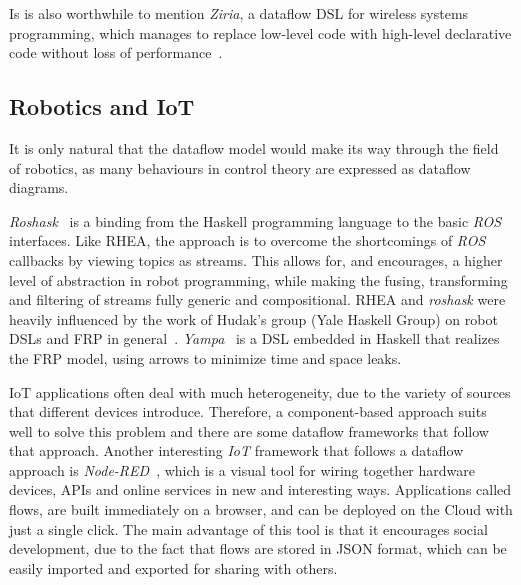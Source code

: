 \documentclass[sigplan,screen,10pt]{acmart}
\begin{document}
Is is also worthwhile to mention \textit{Ziria}, a dataflow DSL for wireless
systems programming, which manages to replace low-level code with high-level
declarative code without loss of performance~\cite{ziria}.

\subsection{Robotics and IoT}

It is only natural that the dataflow model would make its way through the field
of robotics, as many behaviours in control theory are expressed as dataflow
diagrams.

\textit{Roshask}~\cite{roshask} is a binding from the Haskell programming language
to the basic \textit{ROS} interfaces. Like \textsc{RHEA}, the approach is to
overcome the shortcomings of \textit{ROS} callbacks by viewing topics as
streams. This allows for, and encourages, a higher level of abstraction in
robot programming, while making the fusing, transforming and filtering of
streams fully generic and compositional.
\textsc{RHEA} and \textit{roshask} were heavily influenced by the work of Hudak's
group (Yale Haskell Group) on robot DSLs and FRP in general~\cite{fran,arrows_robots,lambda_in_motion}.
\textit{Yampa}~\cite{arrows_robots} is a DSL embedded in Haskell
that realizes the FRP model, using arrows to minimize time and space leaks.


IoT applications often deal with much heterogeneity, due to the variety of
sources that different devices introduce. Therefore, a component-based approach
suits well to solve this problem and there are some dataflow frameworks that
follow that approach.
Another interesting \textit{IoT} framework that follows a dataflow
approach is \textit{Node-RED}~\cite{iot_dataflow}, which is a visual tool for wiring
together hardware devices, APIs and online services in new and interesting ways.
Applications called flows, are built immediately on a browser, and can be
deployed on the Cloud with just a single click. The main advantage of this tool
is that it encourages social development, due to the fact that flows are stored
in JSON format, which can be easily imported and exported for sharing with
others.
\end{document}
